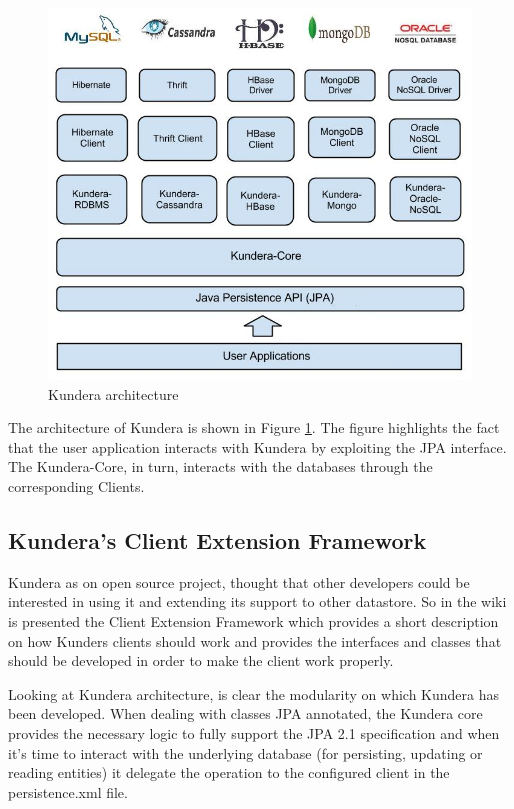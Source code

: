 \begin{figure}[tbh]
  \centering
  \includegraphics[scale=0.5]{images/kundera_architecture}
  \caption{Kundera architecture}
  \label{fig:kundera_architecture}
\end{figure}

The architecture of Kundera is shown in Figure \ref{fig:kundera_architecture}. The figure highlights the fact that the user application interacts with Kundera by exploiting the JPA interface. The Kundera-Core, in turn, interacts with the databases through the corresponding Clients.

\subsection{Kundera's Client Extension Framework}
Kundera as on open source project, thought that other developers could be interested in using it and extending its support to other datastore.
So in the wiki is presented the Client Extension Framework which provides a short description on how Kunders clients should work and provides the interfaces and classes that should be developed in order to make the client work properly.

Looking at Kundera architecture, is clear the modularity on which Kundera has been developed. When dealing with classes JPA annotated, the Kundera core provides the necessary logic to fully support the JPA 2.1 specification and when it's time to interact with the underlying database (for persisting, updating or reading entities) it delegate the operation to the configured client in the persistence.xml file.

